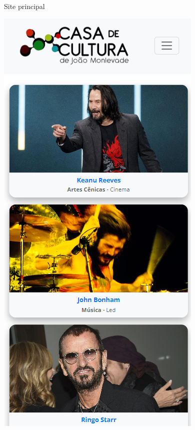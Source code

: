 \begin{frame}{Site principal}
\begin{center}
            \includegraphics[height=\textheight]{beamerthemesrc/assets/responsividade3.png}

\end{center}
\end{frame}
